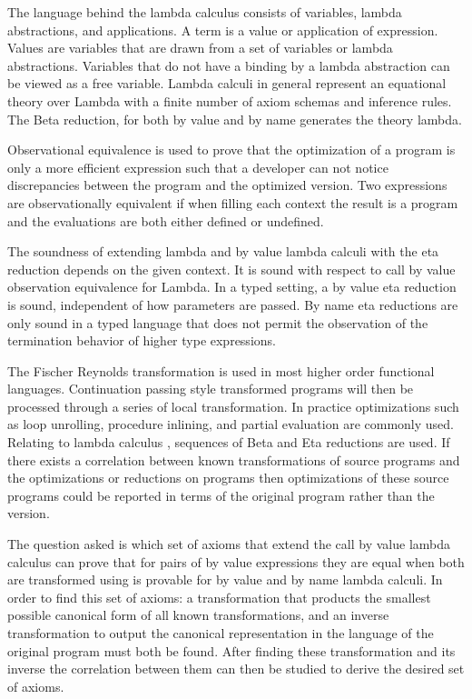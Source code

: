 The language behind the lambda calculus consists of variables, lambda abstractions, and applications. A term is a value or application of expression.  Values are variables that are drawn from a set of variables or lambda abstractions. Variables that do not have a binding by a lambda abstraction can be viewed as a free variable.  Lambda calculi in general represent an equational theory over Lambda with a finite number of axiom schemas and inference rules. The Beta reduction, for both by value and by name generates the theory lambda.

Observational equivalence is used to prove that the optimization of a program is only a more efficient expression such that a developer can not notice discrepancies between the program and the optimized version. Two expressions are observationally equivalent if when filling each context the result is a program and the evaluations are both either defined or undefined.

The soundness of extending lambda and by value lambda calculi with the eta reduction depends on the given context. It is sound with respect to call by value observation equivalence for Lambda. In a typed setting, a by value eta reduction is sound, independent of how parameters are passed. By name eta reductions are only sound in a typed language that does not permit the observation of the termination behavior of higher type expressions.

The Fischer Reynolds \cps transformation is used in most higher order functional languages. Continuation passing style transformed programs will then be processed through a series of local transformation. In practice optimizations such as loop unrolling, procedure inlining, and partial evaluation are commonly used. Relating to lambda calculus , sequences of Beta and Eta reductions are used.  If there exists a correlation between known transformations of source programs and the optimizations or reductions on \cps programs then optimizations of these source programs could be reported in terms of the original program rather than the \cps version.

The question asked is which set of axioms that extend the call by value lambda calculus can prove that for pairs of by value expressions they are equal when both are transformed using \cps is provable for by value and by name lambda calculi.  In order to find this set of axioms: a \cps transformation that products the smallest possible canonical form of all known \cps transformations, and an inverse \cps transformation to output the canonical representation in the language of the original program must both be found.  After finding these \cps transformation and its inverse the correlation between them can then be studied to derive the desired set of axioms.

